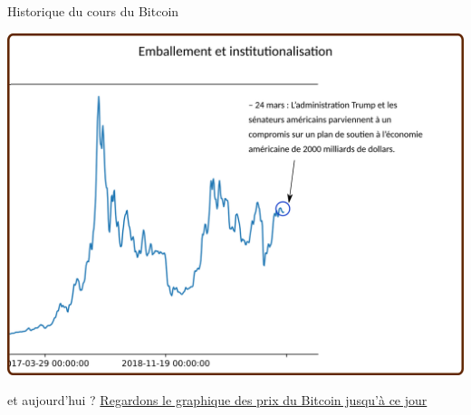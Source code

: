 \documentclass[presentation]{beamer}
\begin{document}
\begin{frame}[label={sec:org6ff9387}]{Historique du cours du Bitcoin}
\begin{block}{}
\begin{center}
\includegraphics[width=.95\textwidth]{./Pictures/Timeline/90emballement_trump.png}
\end{center}
\end{block}

\begin{block}{et aujourd'hui ?}
\href{https://www.coingecko.com/en/coins/bitcoin/usd?chart=7\_days\#panel}{Regardons le graphique des prix du Bitcoin jusqu'à ce jour}
\end{block}
\end{frame}
\end{document}
